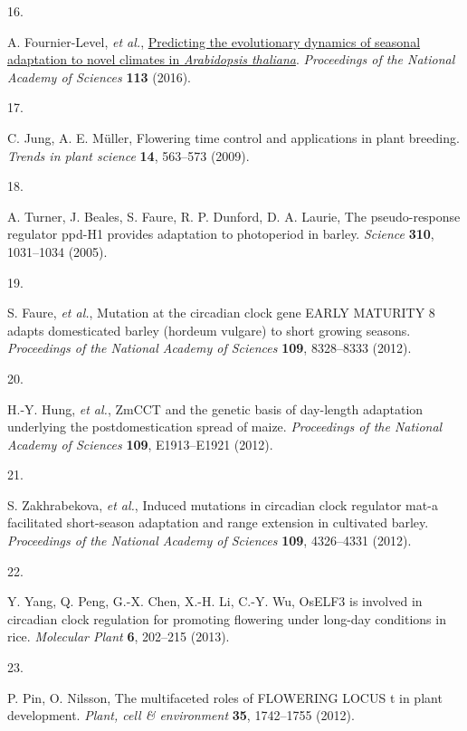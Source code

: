 \documentclass[
  9pt,
  twocolumn,
  twoside]{pnas-new}
\newlength{\cslhangindent}
\newlength{\csllabelwidth}
\newenvironment{CSLReferences}[2] %
 {\begin{list}{}{%
  \setlength{\itemindent}{0pt}
  \setlength{\leftmargin}{0pt}
  \setlength{\parsep}{0pt}
  \ifodd #1
   \setlength{\leftmargin}{\cslhangindent}
   \setlength{\itemindent}{-1\cslhangindent}
  \fi
  \setlength{\itemsep}{#2\baselineskip}}}
 {\end{list}}
\newcommand{\CSLLeftMargin}[1]{\parbox[t]{\csllabelwidth}{\strut#1\strut}}
\newcommand{\CSLRightInline}[1]{\parbox[t]{\linewidth - \csllabelwidth}{\strut#1\strut}}
\begin{document}
\begin{CSLReferences}{0}{1}
\CSLLeftMargin{16. }%
\CSLRightInline{A. Fournier-Level, \emph{et al.},
\href{https://doi.org/10.1073/pnas.1517456113}{Predicting the
evolutionary dynamics of seasonal adaptation to novel climates in
{\emph{Arabidopsis thaliana}}}. \emph{Proceedings of the National
Academy of Sciences} \textbf{113} (2016).}

\CSLLeftMargin{17. }%
\CSLRightInline{C. Jung, A. E. Müller, Flowering time control and
applications in plant breeding. \emph{Trends in plant science}
\textbf{14}, 563--573 (2009).}

\CSLLeftMargin{18. }%
\CSLRightInline{A. Turner, J. Beales, S. Faure, R. P. Dunford, D. A.
Laurie, The pseudo-response regulator ppd-H1 provides adaptation to
photoperiod in barley. \emph{Science} \textbf{310}, 1031--1034 (2005).}

\CSLLeftMargin{19. }%
\CSLRightInline{S. Faure, \emph{et al.}, Mutation at the circadian clock
gene EARLY MATURITY 8 adapts domesticated barley (hordeum vulgare) to
short growing seasons. \emph{Proceedings of the National Academy of
Sciences} \textbf{109}, 8328--8333 (2012).}

\CSLLeftMargin{20. }%
\CSLRightInline{H.-Y. Hung, \emph{et al.}, ZmCCT and the genetic basis
of day-length adaptation underlying the postdomestication spread of
maize. \emph{Proceedings of the National Academy of Sciences}
\textbf{109}, E1913--E1921 (2012).}

\CSLLeftMargin{21. }%
\CSLRightInline{S. Zakhrabekova, \emph{et al.}, Induced mutations in
circadian clock regulator mat-a facilitated short-season adaptation and
range extension in cultivated barley. \emph{Proceedings of the National
Academy of Sciences} \textbf{109}, 4326--4331 (2012).}

\CSLLeftMargin{22. }%
\CSLRightInline{Y. Yang, Q. Peng, G.-X. Chen, X.-H. Li, C.-Y. Wu, OsELF3
is involved in circadian clock regulation for promoting flowering under
long-day conditions in rice. \emph{Molecular Plant} \textbf{6}, 202--215
(2013).}

\CSLLeftMargin{23. }%
\CSLRightInline{P. Pin, O. Nilsson, The multifaceted roles of FLOWERING
LOCUS t in plant development. \emph{Plant, cell \& environment}
\textbf{35}, 1742--1755 (2012).}


\end{CSLReferences}
\end{document}

